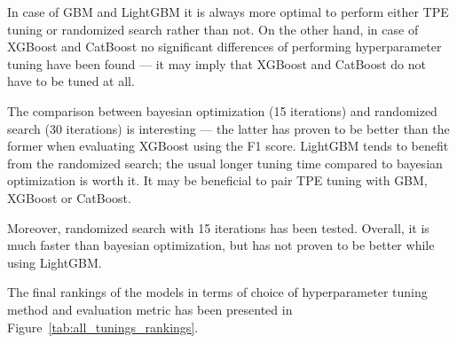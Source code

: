 \documentclass[magisterska, english]{pwr_wmat_praca_dyplomowa}
\theoremstyle{plain}
\numberwithin{theorem}{chapter}
\theoremstyle{definition}
\numberwithin{theorem}{chapter}
\begin{document}
In case of GBM and LightGBM it is always more optimal to perform either TPE tuning or randomized search rather than not. On the other hand, in case of XGBoost and CatBoost no significant differences of performing hyperparameter tuning have been found --- it may imply that XGBoost and CatBoost do not have to be tuned at all.

The comparison between bayesian optimization (15 iterations) and randomized search (30 iterations) is interesting --- the latter has proven to be better than the former when evaluating XGBoost using the F1 score. LightGBM tends to benefit from the randomized search; the usual longer tuning time compared to bayesian optimization is worth it. It may be beneficial to pair TPE tuning with GBM, XGBoost or CatBoost.

Moreover, randomized search with 15 iterations has been tested. Overall, it is much faster than bayesian optimization, but has not proven to be better while using LightGBM.

The final rankings of the models in terms of choice of hyperparameter tuning method and evaluation metric has been presented in Figure~\ref{tab:all_tunings_rankings}. 
\end{document}
